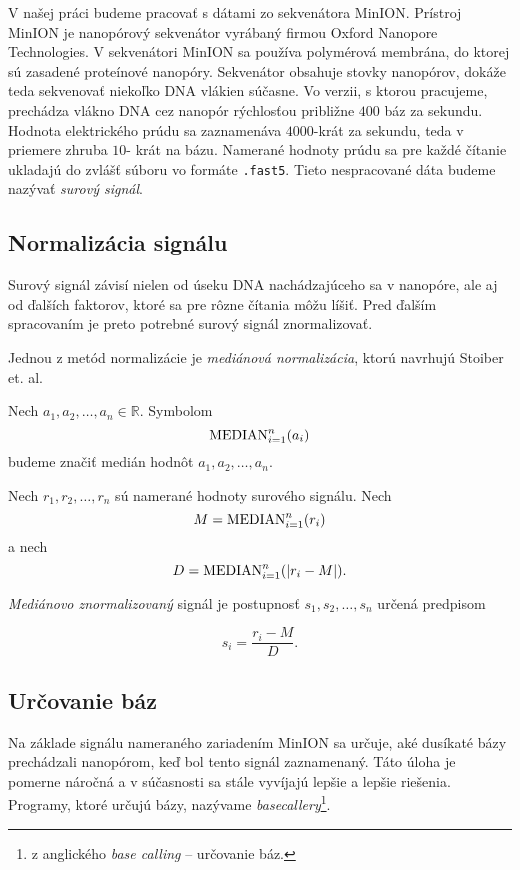 
V našej práci budeme pracovať s dátami zo sekvenátora MinION.
Prístroj MinION je nanopórový sekvenátor vyrábaný firmou Oxford Nanopore Technologies.
V sekvenátori MinION sa používa polymérová membrána, do ktorej sú 
zasadené proteínové nanopóry. Sekvenátor obsahuje stovky nanopórov, dokáže teda sekvenovať niekoľko DNA 
vlákien súčasne.
Vo verzii, s ktorou pracujeme, prechádza vlákno DNA cez nanopór rýchlosťou približne $400$ báz za 
sekundu. Hodnota elektrického prúdu sa zaznamenáva $4000$-krát za sekundu, teda v priemere zhruba $10$-
krát na bázu. Namerané hodnoty prúdu sa pre každé čítanie ukladajú do zvlášť súboru vo formáte 
\texttt{.fast5}. Tieto nespracované dáta budeme nazývať \emph{surový signál}.


\subsection{Normalizácia signálu}

Surový signál závisí nielen od úseku DNA nachádzajúceho sa v nanopóre, ale aj od ďalších faktorov, ktoré 
sa pre rôzne čítania môžu líšiť. Pred ďalším spracovaním je preto potrebné surový signál znormalizovať.

Jednou z metód normalizácie je \emph{mediánová normalizácia}, ktorú navrhujú Stoiber et. al. \cite{Stoiber2017}

\begin{definicia}
Nech $a_1, a_2, \dots, a_n \in \mathbb{R}$. Symbolom
$$\median{i=1}{n}(a_i)$$
budeme značiť medián hodnôt $a_1, a_2, \dots, a_n$.
\end{definicia}

\begin{definicia}
Nech $r_1, r_2, \dots, r_n$ sú namerané hodnoty surového signálu. Nech
 $$M = \median{i=1}{n}(r_i)$$ a nech $$D = \median{i=1}{n}(\abs*{r_i - M}) \text{.}$$

\emph{Mediánovo znormalizovaný} signál je postupnosť $s_1, s_2, \dots, s_n$ určená predpisom

$$s_i = \frac{r_i - M}{D} \text{.}$$

\end{definicia}

\subsection{Určovanie báz}

Na základe signálu nameraného zariadením MinION sa určuje, aké dusíkaté bázy prechádzali nanopórom, keď bol
tento signál zaznamenaný. Táto úloha je pomerne náročná a v súčasnosti sa stále vyvíjajú lepšie a
lepšie riešenia. Programy, ktoré určujú bázy, nazývame \emph{basecallery}\footnote{z anglického \emph{base calling} -- určovanie báz.}.

